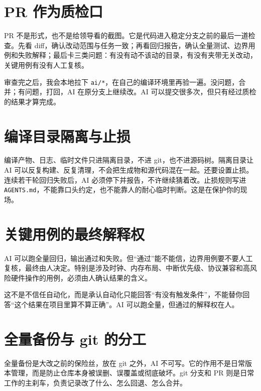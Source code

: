 \section{PR 作为质检口}

PR 不是形式，也不是给领导看的截图。它是代码进入稳定分支之前的最后一道检查。先看 diff，确认改动范围与任务一致；再看回归报告，确认全量测试、边界用例和失败解释；最后卡三类问题：有没有动不该动的目录，有没有夹带无关改动，关键用例有没有人工复核。

审查完之后，我会本地拉下 \texttt{ai/*}，在自己的编译环境里再验一遍。没问题，合并；有问题，打回，AI 在原分支上继续改。AI 可以提交很多次，但只有经过质检的结果才算完成。

\section{编译目录隔离与止损}

编译产物、日志、临时文件只进隔离目录，不进 git，也不进源码树。隔离目录让 AI 可以反复构建、反复清理，不会把生成物和源代码混在一起。还要设置止损。连续若干轮回归失败后，AI 必须停下并报告，不许继续猜着改。止损规则写进 \texttt{AGENTS.md}，不能靠口头约定，也不能靠人的耐心临时判断。这是在保护你的现场。

\section{关键用例的最终解释权}

AI 可以跑全量回归，输出通过和失败。但“通过”能不能信，边界用例要不要人工复核，最终由人决定。特别是涉及时钟、内存布局、中断优先级、协议兼容和高风险硬件操作的用例，必须由人确认结果的含义。

这不是不信任自动化，而是承认自动化只能回答“有没有触发条件”，不能替你回答“这个结果在项目里算不算正确”。AI 可以跑全量，但通过的解释权在人。

\section{全量备份与 git 的分工}

全量备份是大改之前的保险丝，放在 git 之外，AI 不可写。它的作用不是日常版本管理，而是防止仓库本身被误删、误覆盖或彻底破坏。git 分支和 PR 则是日常工作的主刹车，负责记录改了什么、怎么回退、怎么合并。


